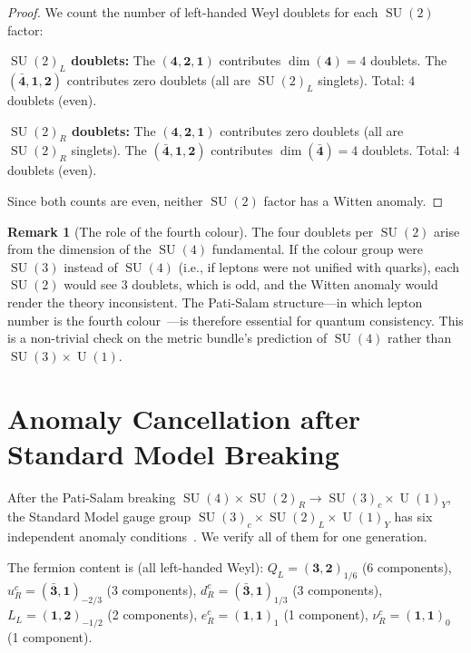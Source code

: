 \documentclass[12pt,a4paper]{article}
\theoremstyle{definition}
\newtheorem{remark}[theorem]{Remark}
\newcommand{\SU}{\operatorname{SU}}
\newcommand{\U}{\operatorname{U}}
\begin{document}
\begin{proof}
We count the number of left-handed Weyl doublets for each $\SU(2)$ factor:

\medskip
\noindent\textbf{$\SU(2)_L$ doublets:}
The $(\mathbf{4}, \mathbf{2}, \mathbf{1})$ contributes $\dim(\mathbf{4}) = 4$ doublets.
The $(\bar{\mathbf{4}}, \mathbf{1}, \mathbf{2})$ contributes zero doublets (all are $\SU(2)_L$ singlets).
Total: $4$ doublets (even).

\medskip
\noindent\textbf{$\SU(2)_R$ doublets:}
The $(\mathbf{4}, \mathbf{2}, \mathbf{1})$ contributes zero doublets (all are $\SU(2)_R$ singlets).
The $(\bar{\mathbf{4}}, \mathbf{1}, \mathbf{2})$ contributes $\dim(\bar{\mathbf{4}}) = 4$ doublets.
Total: $4$ doublets (even).

\medskip
Since both counts are even, neither $\SU(2)$ factor has a Witten anomaly.
\end{proof}

\begin{remark}[The role of the fourth colour]
The four doublets per $\SU(2)$ arise from the dimension of the $\SU(4)$ fundamental.
If the colour group were $\SU(3)$ instead of $\SU(4)$ (i.e., if leptons were not unified with quarks), each $\SU(2)$ would see $3$ doublets, which is odd, and the Witten anomaly would render the theory inconsistent.
The Pati-Salam structure---in which lepton number is the fourth colour~\cite{PatiSalam1974}---is therefore essential for quantum consistency.
This is a non-trivial check on the metric bundle's prediction of $\SU(4)$ rather than $\SU(3) \times \U(1)$.
\end{remark}


\section{Anomaly Cancellation after Standard Model Breaking}
\label{sec:SM_anomalies}

After the Pati-Salam breaking $\SU(4) \times \SU(2)_R \to \SU(3)_c \times \U(1)_Y$, the Standard Model gauge group $\SU(3)_c \times \SU(2)_L \times \U(1)_Y$ has six independent anomaly conditions~\cite{BouchiatIliopoulosMeyer1972}.
We verify all of them for one generation.

The fermion content is (all left-handed Weyl):
$Q_L = (\mathbf{3}, \mathbf{2})_{1/6}$ (6 components),
$u_R^c = (\bar{\mathbf{3}}, \mathbf{1})_{-2/3}$ (3 components),
$d_R^c = (\bar{\mathbf{3}}, \mathbf{1})_{1/3}$ (3 components),
$L_L = (\mathbf{1}, \mathbf{2})_{-1/2}$ (2 components),
$e_R^c = (\mathbf{1}, \mathbf{1})_{1}$ (1 component),
$\nu_R^c = (\mathbf{1}, \mathbf{1})_{0}$ (1 component).
\end{document}
